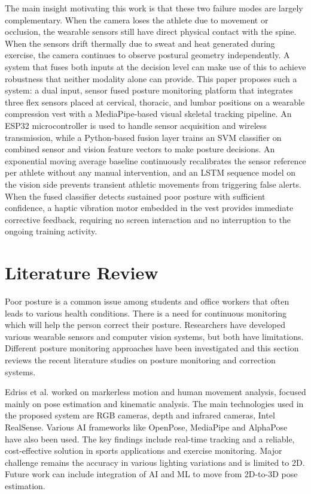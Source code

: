\documentclass[conference]{IEEEtran}
\begin{document}
The main insight motivating this work is that these two failure modes are largely complementary. When the camera loses the athlete due to movement or occlusion, the wearable sensors still have direct physical contact with the spine. When the sensors drift thermally due to sweat and heat generated during exercise, the camera continues to observe postural geometry independently. A system that fuses both inputs at the decision level can make use of this to achieve robustness that neither modality alone can provide.
This paper proposes such a system: a dual input, sensor fused posture monitoring platform that integrates three flex sensors placed at cervical, thoracic, and lumbar positions on a wearable compression vest with a MediaPipe-based visual skeletal tracking pipeline. An ESP32 microcontroller is used to handle sensor acquisition and wireless transmission, while a Python-based fusion layer trains an SVM classifier on combined sensor and vision feature vectors to make posture decisions. An exponential moving average baseline continuously recalibrates the sensor reference per athlete without any manual intervention, and an LSTM sequence model on the vision side prevents transient athletic movements from triggering false alerts. When the fused classifier detects sustained poor posture with sufficient confidence, a haptic vibration motor embedded in the vest provides immediate corrective feedback, requiring no screen interaction and no interruption to the ongoing training activity.

\section{Literature Review}
Poor posture is a common issue among students and office workers that often leads to various health conditions. There is a need for continuous monitoring which will help the person correct their posture. Researchers have developed various wearable sensors and computer vision systems, but both have limitations. Different posture monitoring approaches have been investigated and this section reviews the recent literature studies on posture monitoring and correction systems.

Edriss et al. worked on markerless motion and human movement analysis, focused mainly on pose estimation and kinematic analysis. The main technologies used in the proposed system are RGB cameras, depth and infrared cameras, Intel RealSense. Various AI frameworks like OpenPose, MediaPipe and AlphaPose have also been used. The key findings include real-time tracking and a reliable, cost-effective solution in sports applications and exercise monitoring. Major challenge remains the accuracy in various lighting variations and is limited to 2D. Future work can include integration of AI and ML to move from 2D-to-3D pose estimation. 
\end{document}
